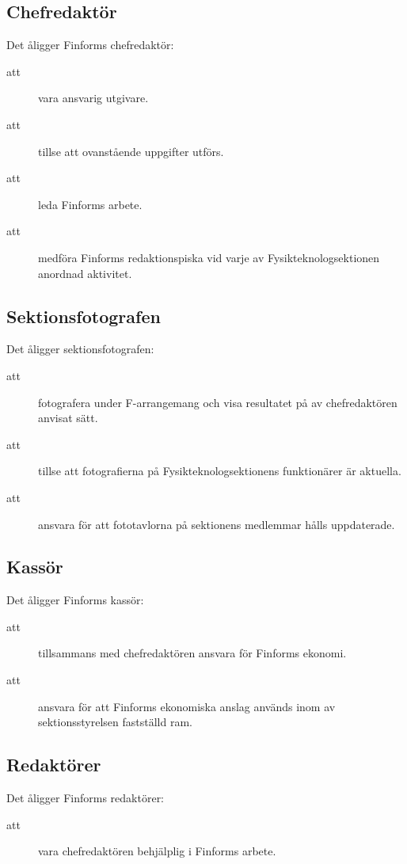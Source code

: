 \documentclass[a4paper]{article}
\begin{document}
\begin{foreningenv}{\forening{}}
    \subsection{Chefredaktör}
    Det åligger Finforms chefredaktör:
    \begin{description}
        \item[att] vara ansvarig utgivare. 
        \item[att] tillse att ovanstående uppgifter utförs.
        \item[att] leda Finforms arbete.
        \item[att] medföra Finforms redaktionspiska vid varje av Fysikteknologsektionen anordnad aktivitet.
    \end{description}
    
    \subsection{Sektionsfotografen}
    Det åligger sektionsfotografen:
    \begin{description}
        \item[att] fotografera under F-arrangemang och visa resultatet på av chef\-redak\-tören anvisat sätt.
        \item[att] tillse att fotografierna på Fysikteknologsektionens funktionärer är aktuella.
        \item[att] ansvara för att fototavlorna på sektionens medlemmar hålls uppdaterade.
    \end{description}
    
    \subsection{Kassör}
    Det åligger Finforms kassör:
    \begin{description}
        \item[att] tillsammans med chefredaktören ansvara för Finforms ekonomi.
        \item[att] ansvara för att Finforms ekonomiska anslag används inom av sektionsstyrelsen fastställd ram.
    \end{description}
    
    \subsection{Redaktörer}
    Det åligger Finforms redaktörer:
    \begin{description}
        \item[att] vara chefredaktören behjälplig i Finforms arbete.
    \end{description}
    

\end{foreningenv}
\end{document}
